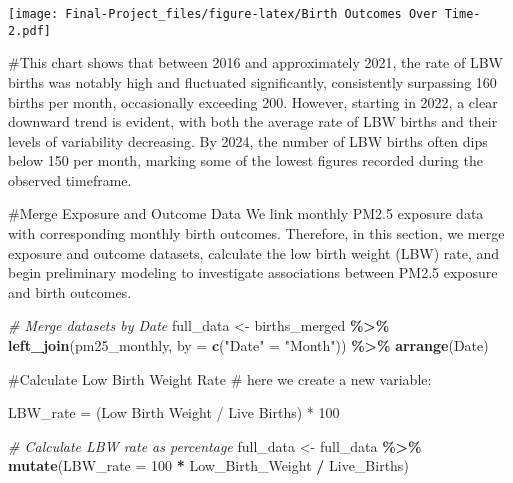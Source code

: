 \documentclass[
]{article}
\newenvironment{Shaded}{\begin{snugshade}}{\end{snugshade}}
\newcommand{\AttributeTok}[1]{\textcolor[rgb]{0.13,0.29,0.53}{#1}}
\newcommand{\CommentTok}[1]{\textcolor[rgb]{0.56,0.35,0.01}{\textit{#1}}}
\newcommand{\DecValTok}[1]{\textcolor[rgb]{0.00,0.00,0.81}{#1}}
\newcommand{\FunctionTok}[1]{\textcolor[rgb]{0.13,0.29,0.53}{\textbf{#1}}}
\newcommand{\NormalTok}[1]{#1}
\newcommand{\OtherTok}[1]{\textcolor[rgb]{0.56,0.35,0.01}{#1}}
\newcommand{\SpecialCharTok}[1]{\textcolor[rgb]{0.81,0.36,0.00}{\textbf{#1}}}
\newcommand{\StringTok}[1]{\textcolor[rgb]{0.31,0.60,0.02}{#1}}
\begin{document}
\texttt{[image: Final-Project\_files/figure-latex/Birth Outcomes Over Time-2.pdf]}

\begin{Shaded}
\begin{Highlighting}[]
\NormalTok{\#This chart shows that between 2016 and approximately 2021, the rate of LBW births was notably high and fluctuated significantly, consistently surpassing 160 births per month, occasionally exceeding 200. However, starting in 2022, a clear downward trend is evident, with both the average rate of LBW births and their levels of variability decreasing. By 2024, the number of LBW births often dips below 150 per month, marking some of the lowest figures recorded during the observed timeframe.}
\end{Highlighting}
\end{Shaded}

\#Merge Exposure and Outcome Data We link monthly PM2.5 exposure data
with corresponding monthly birth outcomes. Therefore, in this section,
we merge exposure and outcome datasets, calculate the low birth weight
(LBW) rate, and begin preliminary modeling to investigate associations
between PM2.5 exposure and birth outcomes.

\begin{Shaded}
\begin{Highlighting}[]
\CommentTok{\# Merge datasets by Date}
\NormalTok{full\_data }\OtherTok{\textless{}{-}}\NormalTok{ births\_merged }\SpecialCharTok{\%\textgreater{}\%}
  \FunctionTok{left\_join}\NormalTok{(pm25\_monthly, }\AttributeTok{by =} \FunctionTok{c}\NormalTok{(}\StringTok{"Date"} \OtherTok{=} \StringTok{"Month"}\NormalTok{)) }\SpecialCharTok{\%\textgreater{}\%}
  \FunctionTok{arrange}\NormalTok{(Date)}
\end{Highlighting}
\end{Shaded}

\#Calculate Low Birth Weight Rate \# here we create a new variable:

LBW\_rate = (Low Birth Weight / Live Births) * 100

\begin{Shaded}
\begin{Highlighting}[]
\CommentTok{\# Calculate LBW rate as percentage}
\NormalTok{full\_data }\OtherTok{\textless{}{-}}\NormalTok{ full\_data }\SpecialCharTok{\%\textgreater{}\%}
  \FunctionTok{mutate}\NormalTok{(}\AttributeTok{LBW\_rate =} \DecValTok{100} \SpecialCharTok{*}\NormalTok{ Low\_Birth\_Weight }\SpecialCharTok{/}\NormalTok{ Live\_Births)}
\end{Highlighting}
\end{Shaded}
\end{document}
